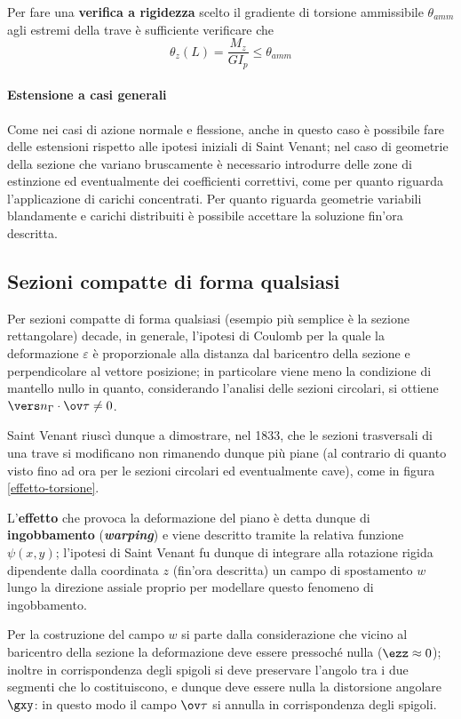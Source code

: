     	Per fare una \textbf{verifica a rigidezza} scelto il gradiente di torsione ammissibile $\theta_{amm}$ agli estremi della trave è sufficiente verificare che
    	\[ \theta_z(L) = \frac{M_z}{GI_p} \leq \theta_{amm} \]
    	
    	\paragraph{Estensione a casi generali} Come nei casi di azione normale e flessione, anche in questo caso è possibile fare delle estensioni rispetto alle ipotesi iniziali di Saint Venant; nel caso di geometrie della sezione che variano bruscamente è necessario introdurre delle zone di estinzione ed eventualmente dei coefficienti correttivi, come per quanto riguarda l'applicazione di carichi concentrati. Per quanto riguarda geometrie variabili blandamente e carichi distribuiti è possibile accettare la soluzione fin'ora descritta.
    	
    \subsection{Sezioni compatte di forma qualsiasi}
    	Per sezioni compatte di forma qualsiasi (esempio più semplice è la sezione rettangolare) decade, in generale, l'ipotesi di Coulomb per la quale la deformazione $\varepsilon$ è proporzionale alla distanza dal baricentro della sezione e perpendicolare al vettore posizione; in particolare viene meno la condizione di mantello nullo in quanto, considerando l'analisi delle sezioni circolari, si ottiene $\vers n_\Gamma  \cdot \ov \tau \neq 0$.
    	
    	Saint Venant riuscì dunque a dimostrare, nel 1833, che le sezioni trasversali di una trave si modificano non rimanendo dunque più piane (al contrario di quanto visto fino ad ora per le sezioni circolari ed eventualmente cave), come in figura \ref{effetto-torsione}.
    	
    	
    	\begin{concetto}
    		L'\textbf{effetto} che provoca la deformazione del piano è detta dunque di \textbf{ingobbamento} (\textit{\textbf{warping}}) e viene descritto tramite la relativa funzione $\psi(x,y)$; l'ipotesi di Saint Venant fu dunque di integrare alla rotazione rigida dipendente dalla coordinata $z$ (fin'ora descritta) un campo di spostamento $w$ lungo la direzione assiale proprio per modellare questo fenomeno di ingobbamento.
    	\end{concetto}
    	Per la costruzione del campo $w$ si parte dalla considerazione che vicino al baricentro della sezione la deformazione deve essere pressoché nulla ($\ezz \approx 0$); inoltre in corrispondenza degli spigoli si deve preservare l'angolo tra i due segmenti che lo costituiscono, e dunque deve essere nulla la distorsione angolare $\gxy$: in questo modo il campo $\ov \tau$ si annulla in corrispondenza degli spigoli.
    	
